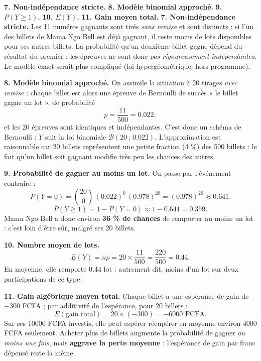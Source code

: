 \documentclass[11pt]{article}
\newcommand{\cle}[1]{{\popxbold\color{popdark}#1}}
\begin{document}
\begin{exoresolu}
\textbf{7. Non-indépendance stricte.} \textbf{8. Modèle binomial approché.} \textbf{9. $P(Y \geq 1)$.} \textbf{10. $E(Y)$.} \textbf{11. Gain moyen total.}
\tcblower
\textbf{7. Non-indépendance stricte.} Les 11 numéros gagnants sont tirés \emph{sans remise} et sont distincts : si l'un des billets de Mama Ngo Bell est déjà gagnant, il reste moins de lots disponibles pour ses autres billets. La probabilité qu'un deuxième billet gagne dépend du résultat du premier : les épreuves ne sont donc \emph{pas rigoureusement indépendantes}. Le modèle exact serait plus compliqué (loi hypergéométrique, hors programme).

\textbf{8. Modèle binomial approché.} On assimile la situation à 20 tirages \emph{avec remise} : chaque billet est alors une épreuve de Bernoulli de succès « le billet gagne un lot », de probabilité
\[
p = \frac{11}{500} = \num{0,022},
\]
et les 20 épreuves sont identiques et indépendantes. C'est donc un \cle{schéma de Bernoulli} : $Y$ suit la loi binomiale $\mathcal{B}\left(20\,;\,\num{0,022}\right)$. L'approximation est raisonnable car 20 billets représentent une petite fraction (4 \%) des 500 billets : le fait qu'un billet soit gagnant modifie très peu les chances des autres.

\textbf{9. Probabilité de gagner au moins un lot.} On passe par l'événement contraire :
\[
P(Y = 0) = \binom{20}{0}\,(\num{0,022})^0\,(\num{0,978})^{20} = (\num{0,978})^{20} \approx \num{0,641}.
\]
\[
P(Y \geq 1) = 1 - P(Y = 0) \approx 1 - \num{0,641} = \num{0,359}.
\]
Mama Ngo Bell a donc environ \textbf{36 \% de chances} de remporter au moins un lot : c'est loin d'être sûr, malgré ses 20 billets.

\textbf{10. Nombre moyen de lots.}
\[
E(Y) = np = 20 \times \frac{11}{500} = \frac{220}{500} = \num{0,44}.
\]
En moyenne, elle remporte \num{0,44} lot : autrement dit, moins d'un lot sur deux participations de ce type.

\textbf{11. Gain algébrique moyen total.} Chaque billet a une espérance de gain de $-300$ FCFA ; par additivité de l'espérance, pour 20 billets :
\[
E(\text{gain total}) = 20 \times (-300) = -\num{6000} \text{ FCFA}.
\]
Sur ses \num{10000} FCFA investis, elle peut espérer récupérer en moyenne environ \num{4000} FCFA seulement. Acheter plus de billets augmente la probabilité de gagner \emph{au moins une fois}, mais \textbf{aggrave la perte moyenne} : l'espérance de gain par franc dépensé reste la même.
\end{exoresolu}
\end{document}
